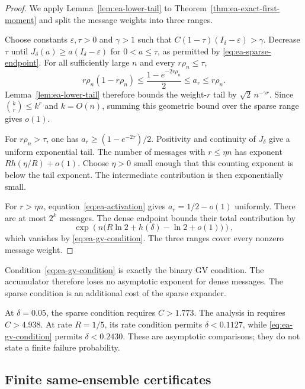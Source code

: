 \begin{proof}
We apply Lemma~\ref{lem:ea-lower-tail} to
Theorem~\ref{thm:ea-exact-first-moment} and split the message weights into
three ranges.

Choose constants $\varepsilon,\tau>0$ and $\gamma>1$ such that
$C(1-\tau)(I_\delta-\varepsilon)>\gamma$.
Decrease $\tau$ until $J_\delta(a)\geq a(I_\delta-\varepsilon)$ for
$0<a\leq\tau$, as permitted by \eqref{eq:ea-sparse-endpoint}.
For all sufficiently large $n$ and every $r\rho_n\leq\tau$,
\[
 r\rho_n(1-r\rho_n)
 \leq\frac{1-e^{-2r\rho_n}}2\leq a_r\leq r\rho_n.
\]
Lemma~\ref{lem:ea-lower-tail} therefore bounds the weight-$r$ tail by
$\sqrt2\,n^{-\gamma r}$.  Since $\binom{k}{r}\leq k^r$ and $k=O(n)$,
summing this geometric bound over the sparse range gives $o(1)$.

For $r\rho_n>\tau$, one has $a_r\geq(1-e^{-2\tau})/2$.  Positivity
and continuity of $J_\delta$ give a uniform exponential tail.  The number of
messages with $r\leq\eta n$ has exponent
$R h(\eta/R)+o(1)$.  Choose $\eta>0$ small enough that this counting exponent
is below the tail exponent.  The intermediate contribution is then
exponentially small.

For $r>\eta n$, equation~\eqref{eq:ea-activation} gives
$a_r=1/2-o(1)$ uniformly.  There are at most $2^k$ messages.  The dense
endpoint bounds their total contribution by
\[
 \exp\!\left(n\bigl(R\ln2+h(\delta)-\ln2+o(1)\bigr)\right),
\]
which vanishes by \eqref{eq:ea-gv-condition}.  The three ranges cover every
nonzero message weight.
\end{proof}

Condition~\eqref{eq:ea-gv-condition} is exactly the binary GV condition.
The accumulator therefore loses no asymptotic exponent for dense messages.
The sparse condition is an additional cost of the sparse expander.

At $\delta=0.05$, the sparse condition requires $C>1.773$.  The analysis in
\cite[Theorem~3.10]{EA} requires $C>4.938$.  At rate $R=1/5$, its rate
condition permits $\delta<0.1127$, while
\eqref{eq:ea-gv-condition} permits $\delta<0.2430$.  These are asymptotic
comparisons; they do not state a finite failure probability.

\subsection{Finite same-ensemble certificates}

